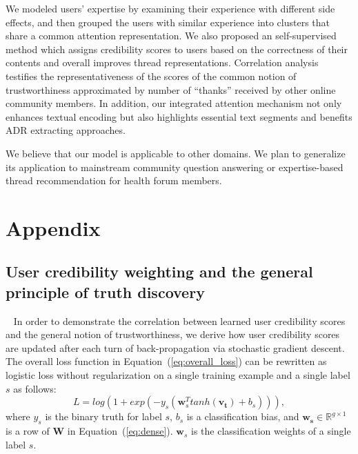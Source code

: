\documentclass{bmcart}
\begin{document}
We modeled users' expertise by examining their experience with different side effects, and then grouped the users with similar experience into clusters that
share a common attention representation. We also proposed an self-supervised method which assigns credibility scores to users based on the correctness of their contents and overall improves thread representations. Correlation analysis testifies the representativeness of the scores of the common notion of trustworthiness approximated by number of ``thanks'' received by other online community members. In addition, our integrated attention mechanism not only enhances textual encoding but also highlights essential text segments and benefits ADR extracting approaches.

We believe that our model is applicable to other domains. We plan to generalize its application to mainstream community question answering or expertise-based thread recommendation for health forum members.


\newpage
\section*{Appendix}
\subsection{User credibility weighting and the general principle of truth discovery}~\label{appendix:math}
In order to demonstrate the correlation between learned user credibility scores and the general notion of trustworthiness, we derive how user credibility scores are updated after each turn of back-propagation via stochastic gradient descent.
The overall loss function in Equation~(\ref{eq:overall_loss}) can be rewritten as logistic loss without regularization on a single training example and a single label $s$ as follows: 
\begin{equation}
    L = log(1+exp(-y_s(\boldsymbol{w}_{s}^T tanh(\boldsymbol{v_t})+b_s))), 
\end{equation}
where $y_s$ is the binary truth for label $s$, $b_s$ is a classification bias, and $\boldsymbol{w_s}\in \mathbb{R}^{g\times1}$ is a row of $\boldsymbol{W}$ in Equation~(\ref{eq:dense}). $\boldsymbol{w}_{s}$ is the classification weights of a single label $s$.
\end{document}
